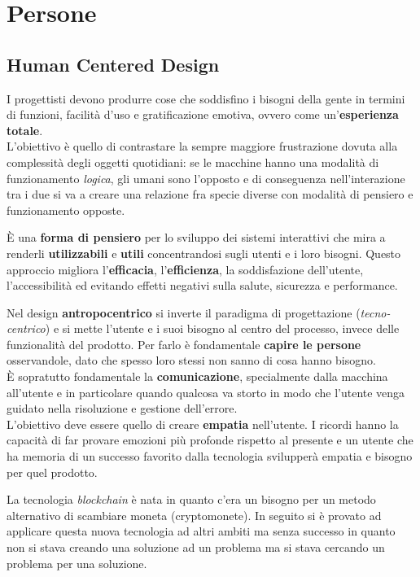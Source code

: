 \newpage
\section{Persone}
\subsection{Human Centered Design}
I progettisti devono produrre cose che soddisfino i bisogni della gente in termini di funzioni, facilità d'uso e gratificazione emotiva, ovvero come un'\textbf{esperienza totale}.\\
L'obiettivo è quello di contrastare la sempre maggiore frustrazione dovuta alla complessità degli oggetti quotidiani: se le macchine hanno una modalità di funzionamento \textit{logica}, gli umani sono l'opposto e di conseguenza nell'interazione tra i due si va a creare una relazione fra specie diverse con modalità di pensiero e funzionamento opposte.

\begin{definition}
	È una \textbf{forma di pensiero} per lo sviluppo dei sistemi interattivi che mira a renderli \textbf{utilizzabili} e \textbf{utili} concentrandosi sugli utenti e i loro bisogni. Questo approccio migliora l'\textbf{efficacia}, l'\textbf{efficienza}, la soddisfazione dell'utente, l'accessibilità ed evitando effetti negativi sulla salute, sicurezza e performance.
\end{definition}

Nel design \textbf{antropocentrico} si inverte il paradigma di progettazione (\textit{tecno-centrico}) e si mette l'utente e i suoi bisogno al centro del processo, invece delle funzionalità del prodotto. Per farlo è fondamentale \textbf{capire le persone} osservandole, dato che spesso loro stessi non sanno di cosa hanno bisogno.\\

È sopratutto fondamentale la \textbf{comunicazione}, specialmente dalla macchina all'utente e in particolare quando qualcosa va storto in modo che l'utente venga guidato nella risoluzione e gestione dell'errore.\\

L'obiettivo deve essere quello di creare \textbf{empatia} nell'utente. I ricordi hanno la capacità di far provare emozioni più profonde rispetto al presente e un utente che ha memoria di un successo favorito dalla tecnologia svilupperà empatia e bisogno per quel prodotto.

\begin{example}[Bitcoin]
	La tecnologia \textit{blockchain} è nata in quanto c'era un bisogno per un metodo alternativo di scambiare moneta (cryptomonete). In seguito si è provato ad applicare questa nuova tecnologia ad altri ambiti ma senza successo in quanto non si stava creando una soluzione ad un problema ma si stava cercando un problema per una soluzione.
\end{example}

